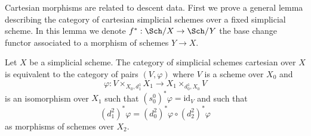 \noindent
Cartesian morphisms are related to descent data. First we prove a general
lemma describing the category of cartesian simplicial schemes over a
fixed simplicial scheme. In this lemma we denote $f^* : \Sch/X \to \Sch/Y$
the base change functor associated to a morphism of schemes $Y \to X$.

\begin{lemma}
\label{lemma-characterize-cartesian-schemes}
Let $X$ be a simplicial scheme. The category of simplicial schemes cartesian
over $X$ is equivalent to the category of pairs $(V, \varphi)$
where $V$ is a scheme over $X_0$ and
$$
\varphi :
V \times_{X_0, d^1_1} X_1
\longrightarrow
X_1 \times_{d^1_0, X_0} V
$$
is an isomorphism over $X_1$ such that
$(s_0^0)^*\varphi = \text{id}_V$ and such that
$$
(d^2_1)^*\varphi = (d^2_0)^*\varphi \circ (d^2_2)^*\varphi
$$
as morphisms of schemes over $X_2$.
\end{lemma}

